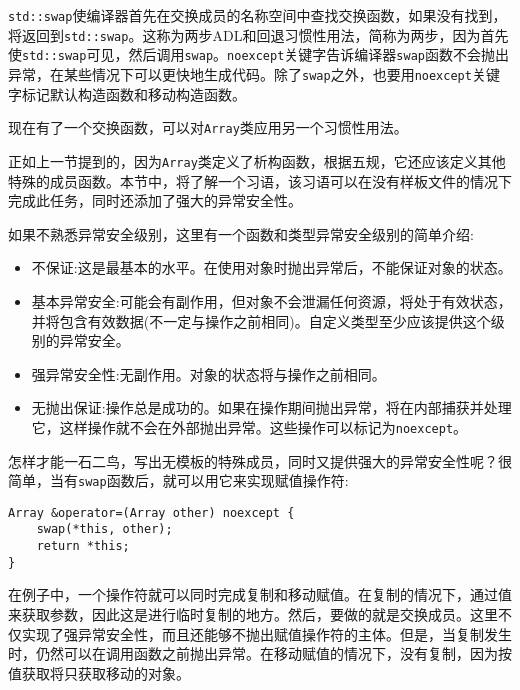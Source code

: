 \texttt{std::swap}使编译器首先在交换成员的名称空间中查找交换函数，如果没有找到，将返回到\texttt{std::swap}。这称为两步ADL和回退习惯性用法，简称为两步，因为首先使\texttt{std::swap}可见，然后调用\texttt{swap}。\texttt{noexcept}关键字告诉编译器\texttt{swap}函数不会抛出异常，在某些情况下可以更快地生成代码。除了\texttt{swap}之外，也要用\texttt{noexcept}关键字标记默认构造函数和移动构造函数。

现在有了一个交换函数，可以对\texttt{Array}类应用另一个习惯性用法。


正如上一节提到的，因为\texttt{Array}类定义了析构函数，根据五规，它还应该定义其他特殊的成员函数。本节中，将了解一个习语，该习语可以在没有样板文件的情况下完成此任务，同时还添加了强大的异常安全性。

如果不熟悉异常安全级别，这里有一个函数和类型异常安全级别的简单介绍:

\begin{itemize}
\item 
不保证:这是最基本的水平。在使用对象时抛出异常后，不能保证对象的状态。

\item 
基本异常安全:可能会有副作用，但对象不会泄漏任何资源，将处于有效状态，并将包含有效数据(不一定与操作之前相同)。自定义类型至少应该提供这个级别的异常安全。

\item 
强异常安全性:无副作用。对象的状态将与操作之前相同。

\item 
无抛出保证:操作总是成功的。如果在操作期间抛出异常，将在内部捕获并处理它，这样操作就不会在外部抛出异常。这些操作可以标记为\texttt{noexcept}。
\end{itemize}

怎样才能一石二鸟，写出无模板的特殊成员，同时又提供强大的异常安全性呢？很简单，当有\texttt{swap}函数后，就可以用它来实现赋值操作符:

\begin{lstlisting}[style=styleCXX]
Array &operator=(Array other) noexcept {
	swap(*this, other);
	return *this;
}
\end{lstlisting}

在例子中，一个操作符就可以同时完成复制和移动赋值。在复制的情况下，通过值来获取参数，因此这是进行临时复制的地方。然后，要做的就是交换成员。这里不仅实现了强异常安全性，而且还能够不抛出赋值操作符的主体。但是，当复制发生时，仍然可以在调用函数之前抛出异常。在移动赋值的情况下，没有复制，因为按值获取将只获取移动的对象。

